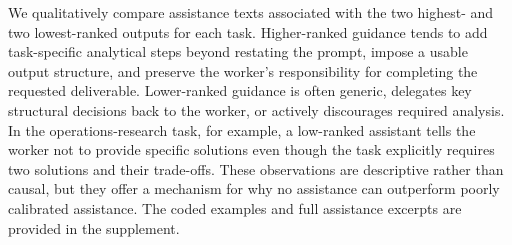 We qualitatively compare assistance texts associated with the two
highest- and two lowest-ranked outputs for each task. Higher-ranked guidance
tends to add task-specific analytical steps beyond restating the prompt,
impose a usable output structure, and preserve the worker's responsibility
for completing the requested deliverable. Lower-ranked guidance is often
generic, delegates key structural decisions back to the worker, or actively
discourages required analysis. In the operations-research task, for example,
a low-ranked assistant tells the worker not to provide specific solutions
even though the task explicitly requires two solutions and their trade-offs.
These observations are descriptive rather than causal, but they offer a
mechanism for why no assistance can outperform poorly calibrated assistance.
The coded examples and full assistance excerpts are provided in the
supplement.

